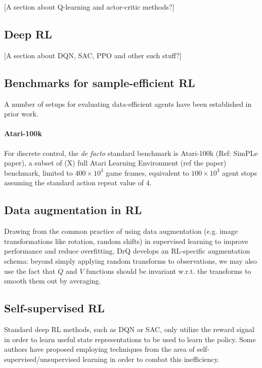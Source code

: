 \documentclass[twoside,11pt]{article}
\begin{document}
  [A section about Q-learning and actor-critic methods?]

\subsection{Deep RL}

[A section about DQN, SAC, PPO and other such stuff?]

\subsection{Benchmarks for sample-efficient RL}

A number of setups for evaluating data-efficient agents have been established in prior work.

\paragraph{Atari-100k} For discrete control, the \emph{de facto} standard benchmark is Atari-100k (Ref: SimPLe paper), a subset of (X) full Atari Learning Environment (ref the paper) benchmark, limited to $400\times 10^3$ game frames, equivalent to $100 \times 10^3$ agent stops assuming the standard action repeat value of $4$.

\subsection{Data augmentation in RL}

Drawing from the common practice of using data augmentation (e.g. image transformations like rotation, random shifts) in supervised learning to improve performance and reduce overfitting, DrQ develops an RL-specific augmentation schema: beyond simply applying random transforms to observations, we may also use the fact that $Q$ and $V$ functions should be invariant w.r.t. the transforms to smooth them out by averaging.

\subsection{Self-supervised RL}

Standard deep RL methods, such as DQN or SAC, only utilize the reward signal in order to learn useful state representations to be used to learn the policy. Some authors have proposed employing techniques from the area of self-supervised/unsupervised learning in order to combat this inefficiency.
\end{document}
